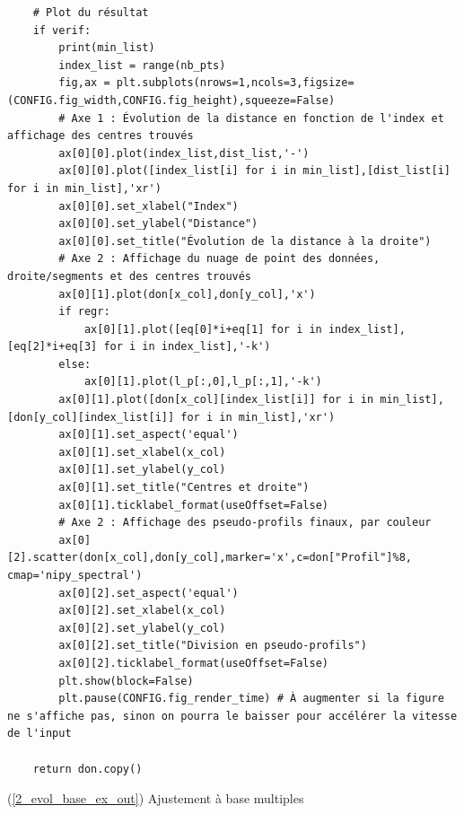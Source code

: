 \documentclass[12pt]{article}
\begin{document}
\begin{lstlisting}
    # Plot du résultat
    if verif:
        print(min_list)
        index_list = range(nb_pts)
        fig,ax = plt.subplots(nrows=1,ncols=3,figsize=(CONFIG.fig_width,CONFIG.fig_height),squeeze=False)
        # Axe 1 : Évolution de la distance en fonction de l'index et affichage des centres trouvés
        ax[0][0].plot(index_list,dist_list,'-')
        ax[0][0].plot([index_list[i] for i in min_list],[dist_list[i] for i in min_list],'xr')
        ax[0][0].set_xlabel("Index")
        ax[0][0].set_ylabel("Distance")
        ax[0][0].set_title("Évolution de la distance à la droite")
        # Axe 2 : Affichage du nuage de point des données, droite/segments et des centres trouvés
        ax[0][1].plot(don[x_col],don[y_col],'x')
        if regr:
            ax[0][1].plot([eq[0]*i+eq[1] for i in index_list],[eq[2]*i+eq[3] for i in index_list],'-k')
        else:
            ax[0][1].plot(l_p[:,0],l_p[:,1],'-k')
        ax[0][1].plot([don[x_col][index_list[i]] for i in min_list],[don[y_col][index_list[i]] for i in min_list],'xr')
        ax[0][1].set_aspect('equal')
        ax[0][1].set_xlabel(x_col)
        ax[0][1].set_ylabel(y_col)
        ax[0][1].set_title("Centres et droite")
        ax[0][1].ticklabel_format(useOffset=False)
        # Axe 2 : Affichage des pseudo-profils finaux, par couleur
        ax[0][2].scatter(don[x_col],don[y_col],marker='x',c=don["Profil"]%8, cmap='nipy_spectral')
        ax[0][2].set_aspect('equal')
        ax[0][2].set_xlabel(x_col)
        ax[0][2].set_ylabel(y_col)
        ax[0][2].set_title("Division en pseudo-profils")
        ax[0][2].ticklabel_format(useOffset=False)
        plt.show(block=False)
        plt.pause(CONFIG.fig_render_time) # À augmenter si la figure ne s'affiche pas, sinon on pourra le baisser pour accélérer la vitesse de l'input
    
    return don.copy()\end{lstlisting}

\newpage
    \label{2_evol_base_ex_in} (\ref{2_evol_base_ex_out}) Ajustement à base multiples
\end{document}
